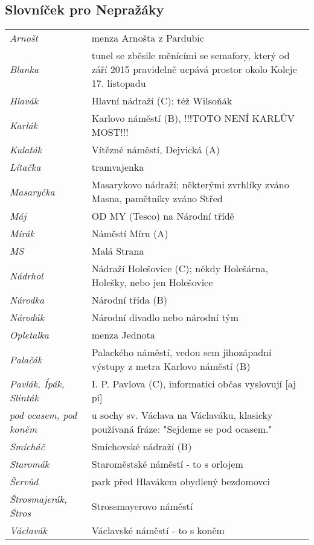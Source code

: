 \subsection{Slovníček pro Nepražáky}
\begin{longtable}{l p{8.5cm}}
    \textit{Arnošt} & menza Arnošta z Pardubic \\
    \textit{Blanka} &  tunel se zběsile měnícími se semafory, který od září 2015 pravidelně ucpává prostor okolo Koleje 17. listopadu \\
    \textit{Hlavák} &  Hlavní nádraží (C); též Wilsoňák \\
    \textit{Karlák} &  Karlovo náměstí (B), !!!TOTO NENÍ KARLŮV MOST!!! \\
    \textit{Kulaťák} &  Vítězné náměstí, Dejvická (A) \\
    \textit{Lítačka} &  tramvajenka \\
    \textit{Masaryčka} &  Masarykovo nádraží; některými zvrhlíky zváno Masna, pamětníky zváno Střed \\
    \textit{Máj} &  OD MY (Tesco) na Národní třídě \\
    \textit{Mírák} &  Náměstí Míru (A) \\
    \textit{MS} &  Malá Strana \\
    \textit{Nádrhol} &  Nádraží Holešovice (C); někdy Holešárna, Holešky, nebo jen Holešovice \\
    \textit{Národka} &  Národní třída (B) \\
    \textit{Nároďák} &  Národní divadlo nebo národní tým \\
    \textit{Opletalka} &  menza Jednota \\
    \textit{Palačák} &  Palackého náměstí, vedou sem jihozápadní výstupy z metra Karlovo náměstí (B) \\
    \textit{Pavlák, Ípák, Slinták} & I. P. Pavlova (C), informatici občas vyslovují [aj pí] \\
    \textit{pod ocasem, pod koněm} & u sochy sv. Václava na Václaváku, klasicky používaná fráze: "Sejdeme se pod ocasem." \\
    \textit{Smícháč} &  Smíchovské nádraží (B) \\
    \textit{Staromák} &  Staroměstské náměstí - to s orlojem \\
    \textit{Šervůd} &  park před Hlavákem obydlený bezdomovci \\
    \textit{Štrosmajerák, Štros} & Strossmayerovo náměstí \\
    \textit{Václavák} &  Václavské náměstí - to s koněm
\end{longtable}